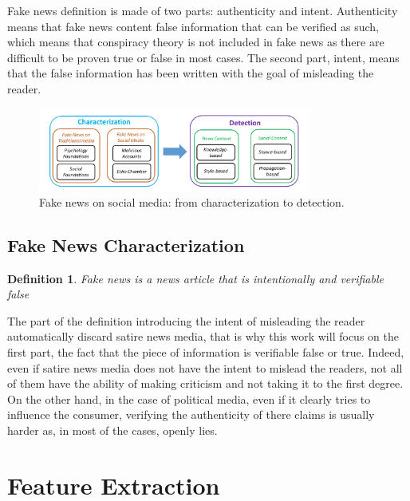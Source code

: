 Fake news definition is made of two parts: authenticity and intent. Authenticity means that fake news content false information that can be verified as such, which means that conspiracy theory is not included in fake news as there are difficult to be proven true or false in most cases. The second part, intent, means that the false information has been written with the goal of misleading the reader. 

\begin{figure}
 \centering
 \includegraphics[width=0.8\textwidth]{images/introduction/characterization.png}
 \caption{Fake news on social media: from characterization to detection.\cite{shu2017fake}}
 \label{fig:intro:characterization}
\end{figure}
\subsection{Fake News Characterization}
\newtheorem{def:fake_news}{Definition}
\begin{def:fake_news}
Fake news is a news article that is intentionally and verifiable false
\end{def:fake_news}
The part of the definition introducing the intent of misleading the reader automatically discard satire news media, that is why this work will focus on the first part, the fact that the piece of information is verifiable false or true. Indeed, even if satire news media does not have the intent to mislead the readers, not all of them have the ability of making criticism and not taking it to the first degree. On the other hand, in the case of political media, even if it clearly tries to influence the consumer, verifying the authenticity of there claims is usually harder as, in most of the cases, openly lies. 
\section{Feature Extraction} \label{intro:feature_extract}
